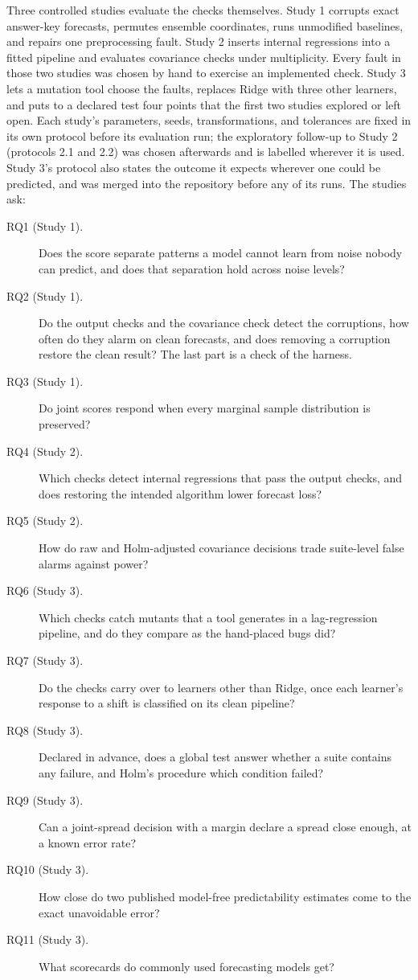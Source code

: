 \documentclass[11pt,a4paper]{article}
\begin{document}
Three controlled studies evaluate the checks themselves. Study 1 corrupts
exact answer-key forecasts, permutes ensemble
coordinates, runs unmodified baselines, and repairs one preprocessing
fault. Study 2 inserts internal regressions into a fitted pipeline and
evaluates covariance checks under multiplicity. Every fault in those two
studies was chosen by hand to exercise an implemented check. Study 3
lets a mutation tool choose the faults, replaces Ridge with three other
learners, and puts to a declared test four points that the first two
studies explored or left open. Each study's parameters,
seeds, transformations, and tolerances are fixed in its own protocol
before its evaluation run; the exploratory follow-up to Study 2
(protocols 2.1 and 2.2) was chosen afterwards and is labelled wherever it
is used. Study 3's protocol also states the outcome it expects wherever
one could be predicted, and was merged into the repository before any of
its runs.
The studies ask:
\begin{description}
\item[RQ1 (Study 1).] Does the score separate patterns a model cannot
learn from noise nobody can predict, and does that separation hold across
noise levels?
\item[RQ2 (Study 1).] Do the output checks and the covariance check
detect the corruptions, how often do they alarm on clean forecasts, and
does removing a corruption restore the clean result? The last part is a
check of the harness.
\item[RQ3 (Study 1).] Do joint scores respond when every marginal sample
distribution is preserved?
\item[RQ4 (Study 2).] Which checks detect internal regressions that
pass the output checks, and does restoring the intended algorithm
lower forecast loss?
\item[RQ5 (Study 2).] How do raw and Holm-adjusted covariance decisions
trade suite-level false alarms against power?
\item[RQ6 (Study 3).] Which checks catch mutants that a tool generates
in a lag-regression pipeline, and do they compare as the hand-placed
bugs did?
\item[RQ7 (Study 3).] Do the checks carry over to learners other than
Ridge, once each learner's response to a shift is classified on its clean
pipeline?
\item[RQ8 (Study 3).] Declared in advance, does a global test answer
whether a suite contains any failure, and Holm's procedure which condition
failed?
\item[RQ9 (Study 3).] Can a joint-spread decision with a margin declare a
spread close enough, at a known error rate?
\item[RQ10 (Study 3).] How close do two published model-free
predictability estimates come to the exact unavoidable error?
\item[RQ11 (Study 3).] What scorecards do commonly used forecasting
models get?
\end{description}
\end{document}
